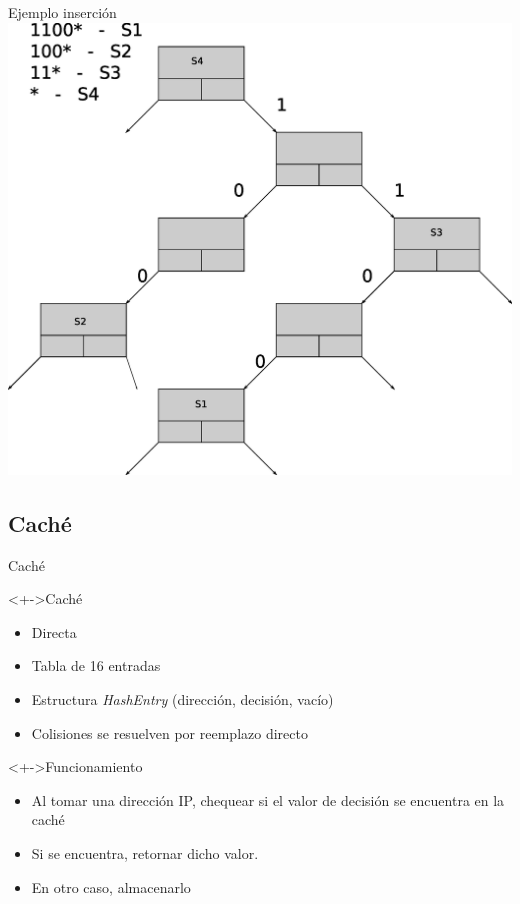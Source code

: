 \documentclass[xcolor=dvipsnames]{beamer}
\begin{document}
\begin{frame}{Ejemplo inserción} 
\center	
\includegraphics[scale=0.30]{figures/lluinsert09.eps} 
\end{frame}

\subsection{Caché}
\begin{frame}{Caché}
  \begin{block}<+->{Caché} 	
    \begin{itemize}
      \scriptsize
     	\item Directa
	\item Tabla de 16 entradas
	\item Estructura \textit{HashEntry} (dirección, decisión, vacío)
	\item Colisiones se resuelven por reemplazo directo
     \end{itemize}
  \end{block}
  
  \begin{block}<+->{Funcionamiento} 	
    \begin{itemize}
      \scriptsize
     	\item Al tomar una dirección IP, chequear si el valor de decisión se encuentra en la caché
	\item Si se encuentra, retornar dicho valor.
	\item En otro caso, almacenarlo
     \end{itemize}
  \end{block}
\end{frame}
\end{document}
